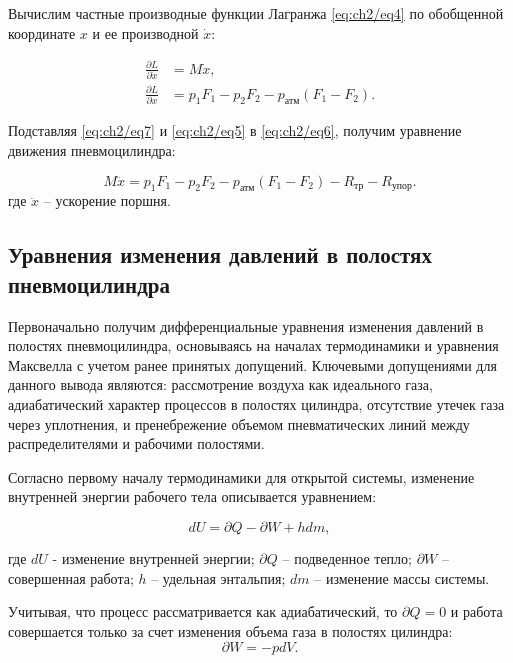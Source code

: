 Вычислим частные производные функции Лагранжа \eqref{eq:ch2/eq4} по обобщенной координате $x$ и ее производной $\dot{x}$:

\begin{equation}\label{eq:ch2/eq7}
    \begin{aligned}
        \frac{\partial L}{\partial \dot{x}} & = M \dot{x},                                    \\
        \frac{\partial L}{\partial x}       & = p_1 F_1 - p_2 F_2 - p_\text{атм} (F_1 - F_2).
    \end{aligned}
\end{equation}

Подставляя \eqref{eq:ch2/eq7} и \eqref{eq:ch2/eq5} в \eqref{eq:ch2/eq6}, получим уравнение движения пневмоцилиндра:

\begin{equation}\label{eq:ch2/eq8}
    M \ddot{x} = p_1 F_1 - p_2 F_2 - p_\text{атм} (F_1 - F_2) - R_{\text{тр}} - R_{\text{упор}}.
\end{equation}
где $\ddot{x}$ -- ускорение поршня.

\subsection{Уравнения изменения давлений в полостях пневмоцилиндра}\label{sec:ch2/sec2/subsec2}

Первоначально получим дифференциальные уравнения изменения давлений в
полостях пневмоцилиндра, основываясь на началах термодинамики
и уравнения Максвелла с учетом ранее принятых допущений.
Ключевыми допущениями для данного вывода являются: рассмотрение
воздуха как идеального газа, адиабатический характер процессов в полостях
цилиндра, отсутствие утечек газа через уплотнения, и пренебрежение объемом
пневматических линий между распределителями и рабочими полостями.

Согласно первому началу термодинамики для открытой системы, изменение внутренней энергии рабочего тела описывается уравнением:

\begin{equation}\label{eq:ch2/first_law}
    dU = \partial Q - \partial W + hdm,
\end{equation}

где $dU$ - изменение внутренней энергии;
$\partial Q$ -- подведенное тепло;
$\partial W$ -- совершенная работа;
$h$ -- удельная энтальпия;
$dm$ -- изменение массы системы.

Учитывая, что процесс рассматривается как адиабатический,
то $\partial Q = 0$ и работа совершается только за счет изменения объема газа в полостях цилиндра:
\begin{equation}\label{eq:ch2/work}
    \partial W = -pdV.
\end{equation}

